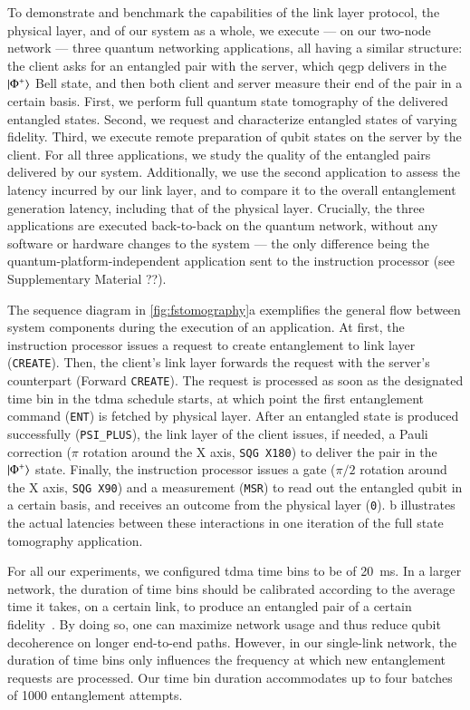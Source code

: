 To demonstrate and benchmark the capabilities of the link layer protocol, the physical layer, and of
our system as a whole, we execute --- on our two-node network --- three quantum networking
applications, all having a similar structure: the client asks for an entangled pair with the server,
which \acrshort{qegp} delivers in the $\ket{\Phi^+}$ Bell state, and then both client and server
measure their end of the pair in a certain basis. First, we perform full quantum state tomography of
the delivered entangled states. Second, we request and characterize entangled states of varying
fidelity. Third, we execute remote preparation of qubit states on the server by the client. For all
three applications, we study the quality of the entangled pairs delivered by our system.
Additionally, we use the second application to assess the latency incurred by our link layer, and to
compare it to the overall entanglement generation latency, including that of the physical layer.
Crucially, the three applications are executed back-to-back on the quantum network, without any
software or hardware changes to the system --- the only difference being the
quantum-platform-independent application sent to the instruction processor (see Supplementary
Material ??).

The sequence diagram in \cref{fig:fstomography}a exemplifies the general flow between system
components during the execution of an application. At first, the instruction processor issues a
request to create entanglement to link layer (\texttt{CREATE}). Then, the client's link layer
forwards the request with the server's counterpart (Forward \texttt{CREATE}). The request is
processed as soon as the designated time bin in the \acrshort{tdma} schedule starts, at which point
the first entanglement command (\texttt{ENT}) is fetched by physical layer. After an entangled state
is produced successfully (\texttt{PSI\_PLUS}), the link layer of the client issues, if needed, a
Pauli correction ($\pi$ rotation around the X axis, \texttt{SQG X180}) to deliver the pair in the
$\ket{\Phi^+}$ state. Finally, the instruction processor issues a gate ($\pi/2$ rotation around the
X axis, \texttt{SQG X90}) and a measurement (\texttt{MSR}) to read out the entangled qubit in a
certain basis, and receives an outcome from the physical layer (\texttt{0}).
b illustrates the actual latencies between these interactions in one
iteration of the full state tomography application.

For all our experiments, we configured \acrshort{tdma} time bins to be of \qty{20}{\ms}. In a larger
network, the duration of time bins should be calibrated according to the average time it takes, on a
certain link, to produce an entangled pair of a certain fidelity~\cite{skrzypczyk_2021_arch}. By
doing so, one can maximize network usage and thus reduce qubit decoherence on longer end-to-end
paths. However, in our single-link network, the duration of time bins only influences the frequency
at which new entanglement requests are processed. Our time bin duration accommodates up to four
batches of \num{1000} entanglement attempts.

